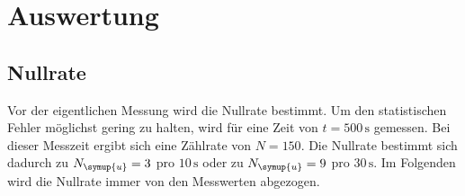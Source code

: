 \section{Auswertung}
\label{sec:Auswertung}
\subsection{Nullrate}
\label{sec:Nullrate}
Vor der eigentlichen Messung wird die Nullrate bestimmt. Um den statistischen Fehler möglichst gering zu halten,
wird für eine Zeit von $t=500\,\unit{\second}$ gemessen. Bei dieser Messzeit ergibt sich eine Zählrate von
$N=150$. Die Nullrate bestimmt sich dadurch zu $N_{\symup{u}}=3$ pro $10\,\unit{\second}$ oder zu
$N_{\symup{u}}=9$ pro $30\,\unit{\second}$. Im Folgenden wird die Nullrate immer von den Messwerten abgezogen.

